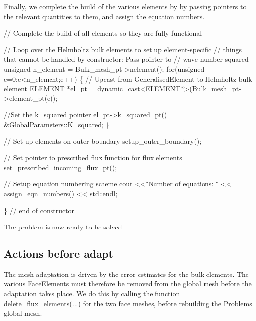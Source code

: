 Finally, we complete the build of the various elements by by passing pointers to the relevant quantities to them, and assign the equation numbers.  
\begin{DoxyCodeInclude}
 \textcolor{comment}{// Complete the build of all elements so they are fully functional}
 
 \textcolor{comment}{// Loop over the Helmholtz bulk elements to set up element-specific }
 \textcolor{comment}{// things that cannot be handled by constructor: Pass pointer to }
 \textcolor{comment}{// wave number squared}
 \textcolor{keywordtype}{unsigned} n\_element = Bulk\_mesh\_pt->nelement();
 \textcolor{keywordflow}{for}(\textcolor{keywordtype}{unsigned} e=0;e<n\_element;e++)
  \{
   \textcolor{comment}{// Upcast from GeneralisedElement to Helmholtz bulk element}
   ELEMENT *el\_pt = \textcolor{keyword}{dynamic\_cast<}ELEMENT*\textcolor{keyword}{>}(Bulk\_mesh\_pt->element\_pt(e));
   
   \textcolor{comment}{//Set the k\_squared  pointer}
   el\_pt->k\_squared\_pt() = &\hyperlink{namespaceGlobalParameters_aae73cb63b27d51a87845c3392cd944eb}{GlobalParameters::K\_squared};
  \}
 
 \textcolor{comment}{// Set up elements on outer boundary}
 setup\_outer\_boundary();
 
 \textcolor{comment}{// Set pointer to prescribed flux function for flux elements}
 set\_prescribed\_incoming\_flux\_pt();

 \textcolor{comment}{// Setup equation numbering scheme}
 cout <<\textcolor{stringliteral}{"Number of equations: "} << assign\_eqn\_numbers() << std::endl; 

\} \textcolor{comment}{// end of constructor}

\end{DoxyCodeInclude}


The problem is now ready to be solved.



 

\hypertarget{index_before_adapt}{}\subsection{Actions before adapt}\label{index_before_adapt}
The mesh adaptation is driven by the error estimates for the bulk elements. The various {\ttfamily Face\+Elements} must therefore be removed from the global mesh before the adaptation takes place. We do this by calling the function {\ttfamily delete\+\_\+flux\+\_\+elements}(...) for the two face meshes, before rebuilding the Problem\textquotesingle{}s global mesh.

